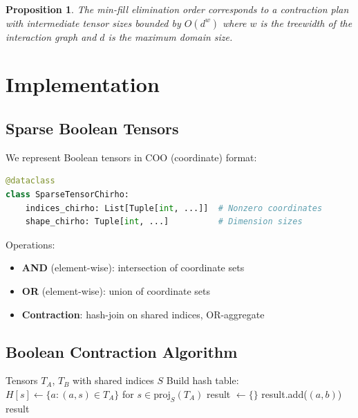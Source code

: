 \documentclass[11pt,a4paper]{article}
\newtheorem{proposition}[theorem]{Proposition}
\begin{document}
\begin{proposition}
The min-fill elimination order corresponds to a contraction plan with intermediate
tensor sizes bounded by $O(d^w)$ where $w$ is the treewidth of the interaction graph
and $d$ is the maximum domain size.
\end{proposition}

\section{Implementation}
\label{sec:implementation_chirho}

\subsection{Sparse Boolean Tensors}

We represent Boolean tensors in COO (coordinate) format:
\begin{lstlisting}[language=Python]
@dataclass
class SparseTensorChirho:
    indices_chirho: List[Tuple[int, ...]]  # Nonzero coordinates
    shape_chirho: Tuple[int, ...]          # Dimension sizes
\end{lstlisting}

Operations:
\begin{itemize}
  \item \textbf{AND} (element-wise): intersection of coordinate sets
  \item \textbf{OR} (element-wise): union of coordinate sets
  \item \textbf{Contraction}: hash-join on shared indices, OR-aggregate
\end{itemize}

\subsection{Boolean Contraction Algorithm}

\begin{algorithm}[ht]
\caption{Boolean Tensor Contraction}
\label{alg:contract_chirho}
\begin{algorithmic}[1]
\Require Tensors $T_A$, $T_B$ with shared indices $S$
\State Build hash table: $H[s] \gets \{a : (a, s) \in T_A\}$ for $s \in \text{proj}_S(T_A)$
\State result $\gets \{\}$
    \State result.add($(a, b)$)  
  \EndFor
\EndFor
\State \Return result
\end{algorithmic}
\end{algorithm}
\end{document}
